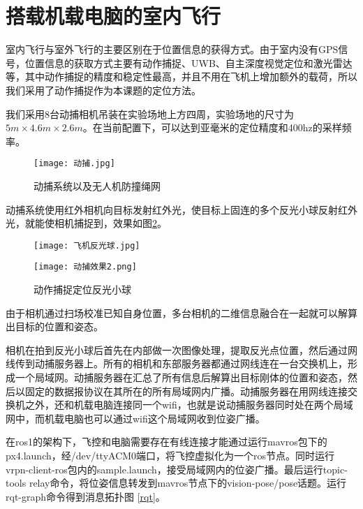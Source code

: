   \section{搭载机载电脑的室内飞行}
室内飞行与室外飞行的主要区别在于位置信息的获得方式。由于室内没有GPS信号，位置信息的获取方式主要有动作捕捉、UWB、自主深度视觉定位和激光雷达等，其中动作捕捉的精度和稳定性最高，并且不用在飞机上增加额外的载荷，所以我们采用了动作捕捉作为本课题的定位方法。

我们采用8台动捕相机吊装在实验场地上方四周，实验场地的尺寸为$5m \times 4.6m \times 2.6m$。在当前配置下，可以达到亚毫米的定位精度和400hz的采样频率\cite{qingtong}。
\begin{figure}[!h]
  \centering
  \texttt{[image: 动捕.jpg]}
  \caption{动捕系统以及无人机防撞绳网}
  \label{动捕}
\end{figure}

动捕系统使用红外相机向目标发射红外光，使目标上固连的多个反光小球反射红外光，就能使相机捕捉到，效果如图\ref{反光小球}。

\newpage

\begin{figure}[h]
  \centering
  \begin{minipage}[c]{0.48\textwidth}
    \centering
    \texttt{[image: 飞机反光球.jpg]}
  \end{minipage}\hfill
    \begin{minipage}[c]{0.48\textwidth}
      \centering
      \texttt{[image: 动捕效果2.png]}
  \end{minipage}
  \caption{动作捕捉定位反光小球}
  \label{反光小球}
  \end{figure}


由于相机通过扫场校准已知自身位置，多台相机的二维信息融合在一起就可以解算出目标的位置和姿态。

相机在拍到反光小球后首先在内部做一次图像处理，提取反光点位置，然后通过网线传到动捕服务器上。所有的相机和东部服务器都通过网线连在一台交换机上，形成一个局域网。动捕服务器在汇总了所有信息后解算出目标刚体的位置和姿态，然后以固定的数据报协议在其所在的所有局域网内广播。动捕服务器在用网线连接交换机之外，还和机载电脑连接同一个wifi，也就是说动捕服务器同时处在两个局域网中，而机载电脑也可以通过wifi这个局域网收到位姿广播。

在ros1的架构下，飞控和电脑需要存在有线连接才能通过运行mavros包下的px4.launch，经/dev/ttyACM0端口，将飞控虚拟化为一个ros节点。同时运行vrpn-client-ros包内的sample.launch，接受局域网内的位姿广播。最后运行topic-tools relay命令，将位姿信息转发到mavros节点下的vision-pose/pose话题。运行rqt-graph命令得到消息拓扑图 \ref{rqt}。

